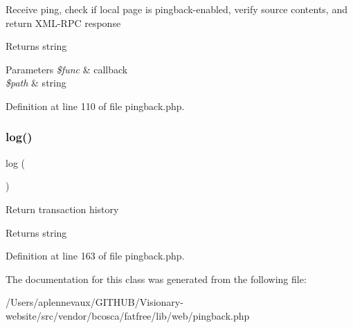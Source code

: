 Receive ping, check if local page is pingback-\/enabled, verify source contents, and return X\+M\+L-\/\+R\+PC response \begin{DoxyReturn}{Returns}
string 
\end{DoxyReturn}

\begin{DoxyParams}{Parameters}
{\em \$func} & callback \\
\hline
{\em \$path} & string \\
\hline
\end{DoxyParams}


Definition at line 110 of file pingback.\+php.

\hypertarget{class_web_1_1_pingback_a5e06d9b7f0033278f40a41d081efbe71}{}\label{class_web_1_1_pingback_a5e06d9b7f0033278f40a41d081efbe71} 
\subsubsection{\texorpdfstring{log()}{log()}}
{\footnotesize\ttfamily log (\begin{DoxyParamCaption}{ }\end{DoxyParamCaption})}

Return transaction history \begin{DoxyReturn}{Returns}
string 
\end{DoxyReturn}


Definition at line 163 of file pingback.\+php.



The documentation for this class was generated from the following file\+:\begin{DoxyCompactItemize}
\item 
/\+Users/aplennevaux/\+G\+I\+T\+H\+U\+B/\+Visionary-\/website/src/vendor/bcosca/fatfree/lib/web/pingback.\+php\end{DoxyCompactItemize}
